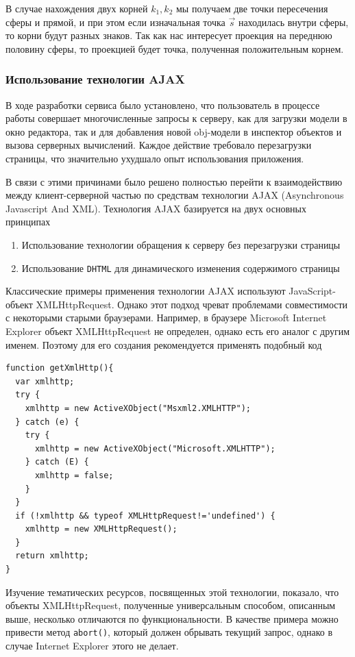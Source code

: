 \documentclass[12pt, a4paper]{article}
\begin{document}
В случае нахождения двух корней $k_1, k_2$ мы получаем две точки пересечения
сферы и прямой, и при этом если изначальная точка $\vec{s}$ находилась внутри
сферы, то корни будут разных знаков. Так как нас интересует проекция на переднюю
половину сферы, то проекцией будет точка, полученная положительным корнем.

\subsubsection{Использование технологии AJAX}

В ходе разработки сервиса было установлено, что пользователь в процессе работы
совершает многочисленные запросы к серверу, как для загрузки модели в окно
редактора, так и для добавления новой obj-модели в инспектор объектов и вызова
серверных вычислений. Каждое действие требовало перезагрузки страницы, что
значительно ухудшало опыт использования приложения.

В связи с этими причинами было решено полностью перейти к взаимодействию между
клиент-серверной частью по средствам технологии AJAX (Asynchronous Javascript
And XML). Технология AJAX базируется на двух основных принципах

\begin{enumerate}
    \item Использование технологии обращения к серверу без перезагрузки страницы
    \item Использование \texttt{DHTML} для динамического изменения содержимого
    страницы
\end{enumerate}

Классические примеры применения технологии AJAX используют JavaScript-объект
XMLHttpRequest. Однако этот подход чреват проблемами совместимости с некоторыми
старыми браузерами. Например, в браузере Microsoft Internet Explorer объект
XMLHttpRequest не определен, однако есть его аналог с другим именем. Поэтому для
его создания рекомендуется применять подобный код

\begin{lstlisting}
function getXmlHttp(){
  var xmlhttp;
  try {
    xmlhttp = new ActiveXObject("Msxml2.XMLHTTP");
  } catch (e) {
    try {
      xmlhttp = new ActiveXObject("Microsoft.XMLHTTP");
    } catch (E) {
      xmlhttp = false;
    }
  }
  if (!xmlhttp && typeof XMLHttpRequest!='undefined') {
    xmlhttp = new XMLHttpRequest();
  }
  return xmlhttp;
}
\end{lstlisting}

Изучение тематических ресурсов, посвященных этой технологии, показало, что
объекты XMLHttpRequest, полученные универсальным способом, описанным выше,
несколько отличаются по функциональности. В качестве примера можно привести
метод \texttt{abort()}, который должен обрывать текущий запрос, однако в случае
Internet Explorer этого не делает.
\end{document}
